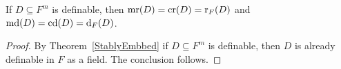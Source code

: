 \begin{comment}
\begin{lem}
MR$(F) = 1$ and MR$(K) \geq \omega $.
\end{lem}

\begin{proof}
As $F$ is not finite, then MR$(F)\geq 1$.
On the other hand, $F$ is stably embedded into $(K, F; \chi)$, and so if MR$(F) \geq 2$, then we would get $X_1, X_2, \ldots$ infinite definable subsets of $F$, disjoint from each other. Using stably embeddedness, all $X_i$ are definable in the field structure of $F$ too, therefore they are either finite or co-finite. Thus a contradiction. Therefore MR$(F) = 1$.

Now, as there is a one-to-one and onto correspondence between $F$ and $\chi(F)$, it follows, that MR$(\chi(F)) = 1$ as well. Without loss of generality, we can assume $K$ is enough saturated, as Morley rank stays the same when we go to an elementary extension. Take infinitely many elements $a_1, a_2, \ldots$ that are algebraically independent over $\qq(\chi(F))$. Then there is a bijection between the set $a_1 \chi(F) + a_2 \chi(F) + \ldots +a_n \chi(F) \subseteq K$ and the cartesian $n$-th power of ${\chi(F)}$, i.e. ${\chi(F)}^n$, which has Morley rank $n$ by, again, stably embeddedness. Thus, MR$(K)\geq \omega$.
\end{proof}
\end{comment}

\begin{comment}

\begin{cor}
MR$(K^n)\geq \omega \cdot n$.
\end{cor}
\begin{proof}
Obvious.
\end{proof}

To prove, that MR$(K)=\omega$, it suffices to prove that for any partition of $K$ into union of disjoint definable sets, one of them has finite Morley rank. As we know from the previous section, $K$ is irreducible of dimension $(1, 0)$, so if we take any partition of $K$ into disjoint definable sets, at least one of them will have dimension strictly smaller than $(1, 0)$. Thus, its dimension is $(0, d)$ for some $d$, and by induction hypothesis, it has Morley rank $d < \omega$. Therefore MR$(K)=\omega$.
\end{comment}

\begin{prop}
If $D \subseteq F^m$ is definable, then $\mathrm{mr}(D)= \mathrm{cr}(D)=\mathrm{r}_F(D)$ and $\mathrm{md}(D)=\mathrm{cd}(D)=\mathrm{d}_F(D)$.
\end{prop}
\begin{proof}
By Theorem~\ref{StablyEmbbed} if $D \subseteq F^m$ is definable, then $D$ is already definable in $F$ as a field. The conclusion follows.
\end{proof}

